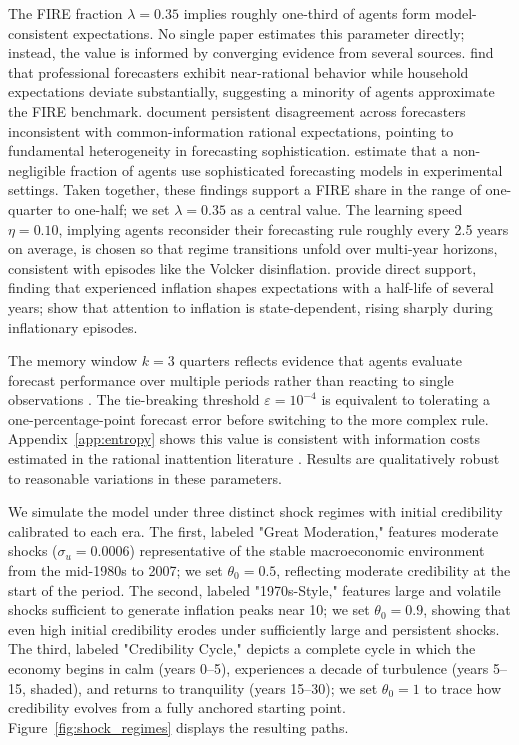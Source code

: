 \documentclass[10pt]{article}
\begin{document}
The FIRE fraction $\lambda = 0.35$ implies roughly one-third of agents form model-consistent expectations. No single paper estimates this parameter directly; instead, the value is informed by converging evidence from several sources. \citet{coibion2015} find that professional forecasters exhibit near-rational behavior while household expectations deviate substantially, suggesting a minority of agents approximate the FIRE benchmark. \citet{mankiw2003disagreement} document persistent disagreement across forecasters inconsistent with common-information rational expectations, pointing to fundamental heterogeneity in forecasting sophistication. \citet{branch2004model} estimate that a non-negligible fraction of agents use sophisticated forecasting models in experimental settings. Taken together, these findings support a FIRE share in the range of one-quarter to one-half; we set $\lambda = 0.35$ as a central value. The learning speed $\eta = 0.10$, implying agents reconsider their forecasting rule roughly every 2.5 years on average, is chosen so that regime transitions unfold over multi-year horizons, consistent with episodes like the Volcker disinflation. \citet{malmendier2016learning} provide direct support, finding that experienced inflation shapes expectations with a half-life of several years; \citet{weber2025} show that attention to inflation is state-dependent, rising sharply during inflationary episodes.

The memory window $k = 3$ quarters reflects evidence that agents evaluate forecast performance over multiple periods rather than reacting to single observations \citep{blinder2000}. The tie-breaking threshold $\varepsilon = 10^{-4}$ is equivalent to tolerating a one-percentage-point forecast error before switching to the more complex rule. Appendix~\ref{app:entropy} shows this value is consistent with information costs estimated in the rational inattention literature \citep{sims2003implications, mackowiak2009optimal}. Results are qualitatively robust to reasonable variations in these parameters.

We simulate the model under three distinct shock regimes with initial credibility calibrated to each era. The first, labeled "Great Moderation," features moderate shocks ($\sigma_u = 0.0006$) representative of the stable macroeconomic environment from the mid-1980s to 2007; we set $\theta_0 = 0.5$, reflecting moderate credibility at the start of the period. The second, labeled "1970s-Style," features large and volatile shocks sufficient to generate inflation peaks near 10; we set $\theta_0 = 0.9$, showing that even high initial credibility erodes under sufficiently large and persistent shocks. The third, labeled "Credibility Cycle," depicts a complete cycle in which the economy begins in calm (years 0--5), experiences a decade of turbulence (years 5--15,  shaded), and returns to tranquility (years 15--30); we set $\theta_0 = 1$ to trace how credibility evolves from a fully anchored starting point. Figure~\ref{fig:shock_regimes} displays the resulting paths.
\end{document}
